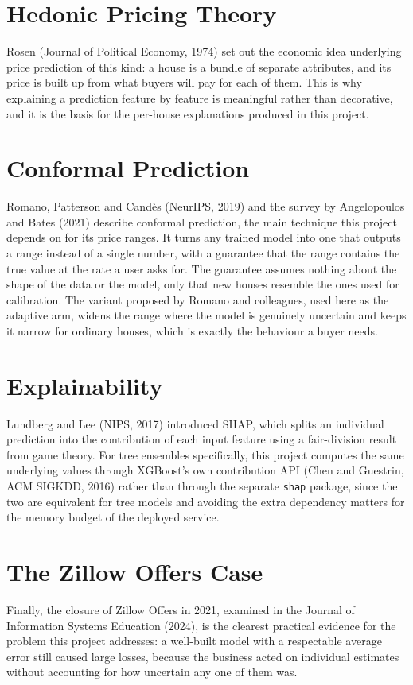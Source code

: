 \documentclass[12pt]{report}
\begin{document}
\section{Hedonic Pricing Theory}
Rosen (Journal of Political Economy, 1974) set out the economic idea underlying price
prediction of this kind: a house is a bundle of separate attributes, and its price is
built up from what buyers will pay for each of them. This is why explaining a
prediction feature by feature is meaningful rather than decorative, and it is the
basis for the per-house explanations produced in this project.

\section{Conformal Prediction}
Romano, Patterson and Cand\`es (NeurIPS, 2019) and the survey by Angelopoulos and
Bates (2021) describe conformal prediction, the main technique this project depends
on for its price ranges. It turns any trained model into one that outputs a range
instead of a single number, with a guarantee that the range contains the true value
at the rate a user asks for. The guarantee assumes nothing about the shape of the
data or the model, only that new houses resemble the ones used for calibration. The
variant proposed by Romano and colleagues, used here as the adaptive arm, widens the
range where the model is genuinely uncertain and keeps it narrow for ordinary houses,
which is exactly the behaviour a buyer needs.

\section{Explainability}
Lundberg and Lee (NIPS, 2017) introduced SHAP, which splits an individual prediction
into the contribution of each input feature using a fair-division result from game
theory. For tree ensembles specifically, this project computes the same underlying
values through XGBoost's own contribution API (Chen and Guestrin, ACM SIGKDD, 2016)
rather than through the separate \texttt{shap} package, since the two are equivalent
for tree models and avoiding the extra dependency matters for the memory budget of
the deployed service.

\section{The Zillow Offers Case}
Finally, the closure of Zillow Offers in 2021, examined in the Journal of Information
Systems Education (2024), is the clearest practical evidence for the problem this
project addresses: a well-built model with a respectable average error still caused
large losses, because the business acted on individual estimates without accounting
for how uncertain any one of them was.
\end{document}
